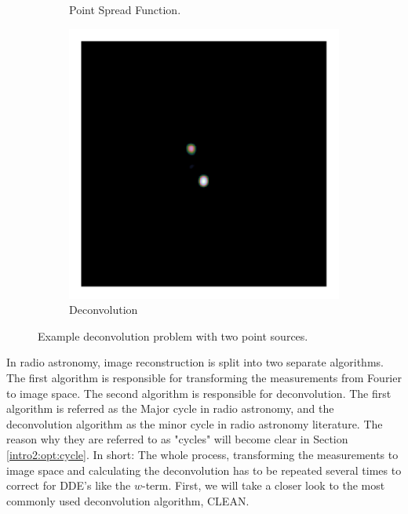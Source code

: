\begin{figure}[h]
\begin{subfigure}[b]{0.3\linewidth}
		\caption{Point Spread Function.}
		\label{radio:alg:psf}
	\end{subfigure}
	\begin{subfigure}[b]{0.3\linewidth}
		\includegraphics[width=\linewidth, clip, trim= 0.25in 0.25in 0.25in 0.25in]{./chapters/03.cd/simulated/elasticNet.png}
		\caption{Deconvolution}
		\label{radio:alg:elastic}
	\end{subfigure}

	\caption{Example deconvolution problem with two point sources.}
	\label{radio:alg:figure}
\end{figure}

In radio astronomy, image reconstruction is split into two separate algorithms. The first algorithm is responsible for transforming the measurements from Fourier to image space. The second algorithm is responsible for deconvolution. The first algorithm is referred as the Major cycle in radio astronomy, and the deconvolution algorithm as the minor cycle in radio astronomy literature. The reason why they are referred to as "cycles" will become clear in Section \ref{intro2:opt:cycle}. In short: The whole process, transforming the measurements to image space and calculating the deconvolution has to be repeated several times to correct for DDE's like the $w$-term. First, we will take a closer look to the most commonly used deconvolution algorithm, CLEAN.


